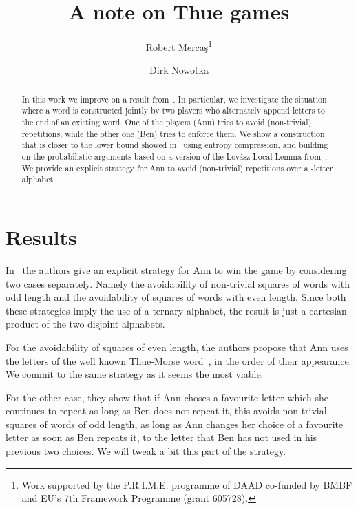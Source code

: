\documentclass[runningheads,fleqn]{llncs}
\begin{document}
\mainmatter

\title{A note on Thue games}


\author{Robert Merca\c{s}\thanks{Work supported by the P.R.I.M.E. programme of  DAAD co-funded by BMBF and EU's 7th Framework Programme (grant 605728).
} \and Dirk Nowotka}




\maketitle

\begin{abstract}
In this work we improve on a result from~\cite{GryKosZma15}. In particular, we investigate the situation where a word is constructed jointly by two players who alternately append letters to the end of an existing word. One of the players (Ann) tries to avoid (non-trivial) repetitions, while the other one (Ben) tries to enforce them. We show a construction that is closer to the lower bound showed in~\cite{GryKozMic13} using entropy compression, and building on the probabilistic arguments based on a version of the Lov\'asz Local Lemma from~\cite{Peg11}. We provide an explicit strategy for Ann to avoid (non-trivial) repetitions over a -letter alphabet.
\end{abstract}


\section{Results}
In~\cite{GryKosZma15} the authors give an explicit strategy for Ann to win the game by considering two cases separately. Namely the avoidability of non-trivial squares of words with odd length and the avoidability of squares of words with even length. Since both these strategies imply the use of a ternary alphabet, the result is just a cartesian product of the two disjoint alphabets.

For the avoidability of squares of even length, the authors propose that Ann uses the letters of the well known Thue-Morse word~\cite{Thu12}, in the order of their appearance. We commit to the same strategy as it seems the most viable. 

For the other case, they show that if Ann choses a favourite letter which she continues to repeat as long as Ben does not repeat it, this avoids non-trivial squares of words of odd length, as long as Ann changes her choice of a favourite letter as soon as Ben repeats it, to the letter that Ben has not used in his previous two choices. We will tweak a bit this part of the strategy.
\end{document}
